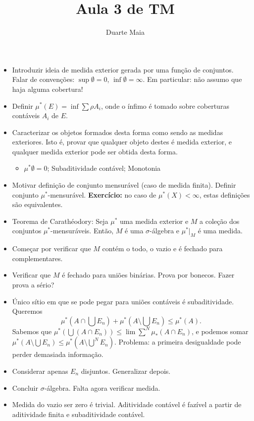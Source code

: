 \documentclass{article}
\title{Aula 3 de TM}
\author{Duarte Maia}
\date{}
\begin{document}
\maketitle
\vspace{-1cm}
\begin{itemize}
\item Introduzir ideia de medida exterior gerada por uma função de conjuntos. Falar de convenções: $\sup \emptyset = 0$, $\inf \emptyset = \infty$. Em particular: não assumo que haja alguma cobertura!
\item Definir $\mu^*(E) = \inf \sum \rho A_i$, onde o ínfimo é tomado sobre coberturas contáveis $A_i$ de $E$.
\item Caracterizar os objetos formados desta forma como sendo as medidas exteriores. Isto é, provar que qualquer objeto destes é medida exterior, e qualquer medida exterior pode ser obtida desta forma.
\begin{itemize}
\item $\mu^* \emptyset = 0$; Subaditividade contável; Monotonia
\end{itemize}
\item Motivar definição de conjunto mensurável (caso de medida finita). Definir conjunto $\mu^*$-mensurável. \textbf{Exercício:} no caso de $\mu^*(X) < \infty$, estas definições são equivalentes.
\item Teorema de Carathéodory: Seja $\mu^*$ uma medida exterior e $M$ a coleção dos conjuntos $\mu^*$-mensuráveis. Então, $M$ é uma $\sigma$-álgebra e $\mu^*|_M$ é uma medida.
\item Começar por verificar que $M$ contém o todo, o vazio e é fechado para complementares.
\item Verificar que $M$ é fechado para uniões binárias. Prova por bonecos. Fazer prova a sério?
\item Único sítio em que se pode pegar para uniões contáveis é subaditividade. Queremos
\[\mu^*( A \cap \bigcup E_n ) + \mu^*(A \setminus \bigcup E_n) \leq \mu^*(A).\]
Sabemos que $\mu^*(\bigcup (A \cap E_n)) \leq \lim \sum^N \mu_*(A \cap E_n)$, e podemos somar $\mu^*(A \setminus \bigcup E_n) \leq \mu^*(A \setminus \bigcup^N E_n)$. Problema: a primeira desigualdade pode perder demasiada informação.
\item Considerar apenas $E_n$ disjuntos. Generalizar depois.
\item Concluir $\sigma$-álgebra. Falta agora verificar medida.
\item Medida do vazio ser zero é trivial. Aditividade contável é fazível a partir de aditividade finita e subaditividade contável.

\end{itemize}
\end{document}
